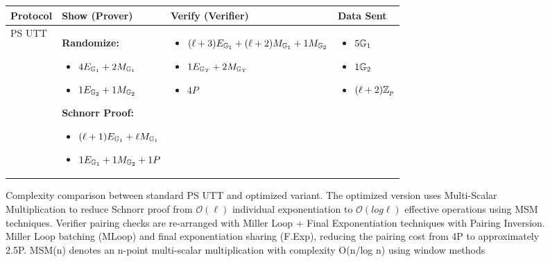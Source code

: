 \begin{figure}
    \centering
    \caption{Complexity comparison between standard PS UTT and optimized variant. The optimized version uses Multi-Scalar Multiplication to reduce Schnorr proof from $\mathcal{O}(\ell)$ individual exponentiation to $\mathcal{O}(log \ell)$ effective operations using MSM techniques. Verifier pairing checks are re-arranged with Miller Loop + Final Exponentiation techniques with Pairing Inversion. Miller Loop batching (MLoop) and final exponentiation sharing (F.Exp), reducing the pairing cost from 4P to approximately 2.5P. MSM(n) denotes an n-point multi-scalar multiplication with complexity O(n/log n) using window methods}
    \label{fig:enter-label}
        \begin{tabular}{|l|p{4.5cm}|p{4.5cm}|p{3.5cm}|}
            \hline
            \textbf{Protocol} & \textbf{Show (Prover)} & \textbf{Verify (Verifier)} & \textbf{Data Sent} \\
            \hline
            PS UTT &
            \textbf{Randomize:}
            \begin{itemize}[nosep]
                \item $4E_{\mathbb{G}_1} + 2M_{\mathbb{G}_1}$ 
                \item $1E_{\mathbb{G}_2} + 1M_{\mathbb{G}_2}$
            \end{itemize}
            \textbf{Schnorr Proof:}
            \begin{itemize}[nosep]
                \item $(\ell+1)E_{\mathbb{G}_1} + \ell M_{\mathbb{G}_1}$ 
                \item $1E_{\mathbb{G}_1} + 1M_{\mathbb{G}_2} + 1P$ 
            \end{itemize}
            &
            \begin{itemize}[nosep]
                \item $(\ell+3)E_{\mathbb{G}_1} + (\ell+2)M_{\mathbb{G}_1} + 1M_{\mathbb{G}_2}$
                \item $1E_{\mathbb{G}_T} + 2M_{\mathbb{G}_T}$
                \item $4P$ 
            \end{itemize}
            &
            \begin{itemize}[nosep]
                \item $5\mathbb{G}_1$
                \item $1\mathbb{G}_2$
                \item $(\ell+2)\mathbb{Z}_p$
            \end{itemize}
            \\
             \hline

\end{tabular}
\end{figure}
